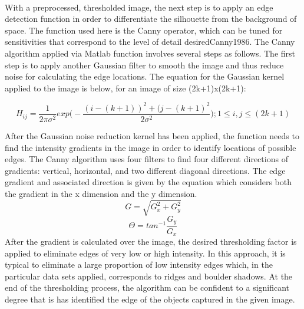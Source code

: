 \\With a preprocessed, thresholded image, the next step is to apply an edge detection function in order to differentiate the silhouette from the background of space. The function used here is the Canny operator, which can be tuned for sensitivities that correspond to the level of detail desired{Canny1986}. The Canny algorithm applied via Matlab function involves several steps as follows. The first step is to apply another Gaussian filter to smooth the image and thus reduce noise for calculating the edge locations. The equation for the Gaussian kernel applied to the image is below, for an image of size (2k+1)x(2k+1):

\begin{equation}
    H_{ij} = \frac{1}{2\pi \sigma^2} exp\Big(-\frac{(i-(k+1))^2 + (j-(k+1)^2}{2\sigma^2}\Big); 1 \leq i, j \leq (2k+1)
\end{equation}

After the Gaussian noise reduction kernel has been applied, the function needs to find the intensity gradients in the image in order to identify locations of possible edges. The Canny algorithm uses four filters to find four different directions of gradients: vertical, horizontal, and two different diagonal directions. The edge gradient and associated direction is given by the equation which considers both the gradient in the x dimension and the y dimension. 
\begin{equation}
    G = \sqrt{G_x^2 + G_y^2}
\end{equation}
\begin{equation}
    \Theta = tan^{-1}\frac{G_y}{G_x}
\end{equation}
After the gradient is calculated over the image, the desired thresholding factor is applied to eliminate edges of very low or high intensity. In this approach, it is typical to eliminate a large proportion of low intensity edges which, in the particular data sets applied, corresponds to ridges and boulder shadows. At the end of the thresholding process, the algorithm can be confident to a significant degree that is has identified the edge of the objects captured in the given image.

    
